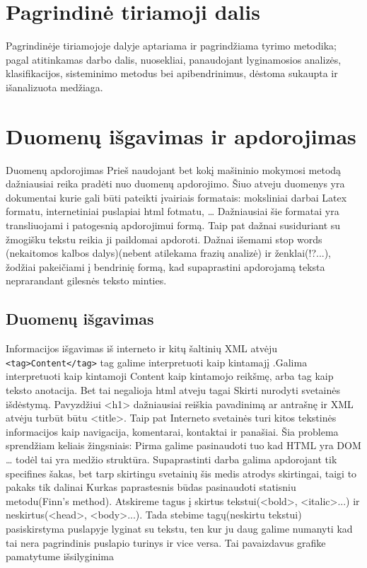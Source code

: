 \documentclass{VUMIFInfKursinis}
\begin{document}
\section{Pagrindinė tiriamoji dalis}
Pagrindinėje tiriamojoje dalyje aptariama ir pagrindžiama tyrimo metodika;
pagal atitinkamas darbo dalis, nuosekliai, panaudojant lyginamosios analizės,
klasifikacijos, sisteminimo metodus bei apibendrinimus, dėstoma sukaupta ir
išanalizuota medžiaga.

\section{Duomenų išgavimas ir apdorojimas}
Duomenų apdorojimas
	Prieš naudojant bet kokį mašininio mokymosi metodą dažniausiai reika pradėti nuo duomenų apdorojimo. Šiuo atveju duomenys yra dokumentai kurie gali būti pateikti įvairiais formatais: moksliniai darbai Latex formatu, internetiniai puslapiai html fotmatu, … Dažniausiai šie formatai yra transliuojami i patogesnią apdorojimui formą. Taip pat dažnai susiduriant su žmogišku tekstu reikia ji paildomai apdoroti. Dažnai išemami stop words (nekaitomos kalbos dalys)(nebent atilekama frazių analizė) ir ženklai(!?...), žodžiai pakeičiami į bendrinię formą, kad supaprastini apdorojamą teksta neprarandant gilesnės teksto minties. 
\subsection{Duomenų išgavimas}
Informacijos išgavimas iš interneto ir kitų šaltinių
	XML atvėju \texttt{<tag>Content</tag>} tag galime interpretuoti kaip kintamajį .Galima interpretuoti kaip  kintamoji Content kaip kintamojo reikšmę, arba tag kaip teksto anotacija. Bet tai negalioja html atveju tagai Skirti nurodyti svetainės išdėstymą. Pavyzdžiui <h1> dažniausiai reiškia pavadinimą ar antrašnę ir XML atvėju turbūt būtu <title>. Taip pat Interneto svetainės turi  kitos tekstinės informacijos kaip navigacija, komentarai, kontaktai ir panašiai. Šia problema sprendžiam keliais žingsniais:
Pirma galime pasinaudoti tuo kad HTML yra DOM … todėl tai yra medžio struktūra. Supaprastinti darba galima apdorojant tik specifines šakas, bet tarp skirtingu svetainių šis medis atrodys skirtingai, taigi to pakaks tik dalinai
Kurkas paprastesnis būdas pasinaudoti statisniu metodu(Finn’s method). Atskireme tagus į skirtus tekstui(<bold>, <italic>...) ir neskirtus(<head>, <body>...). Tada stebime tagų(neskirtu tekstui) pasiskirstyma puslapyje lyginat su tekstu, ten kur ju daug galime numanyti kad tai nera pagrindinis puslapio turinys ir vice versa. Tai pavaizdavus grafike pamatytume išsilyginima
\end{document}
